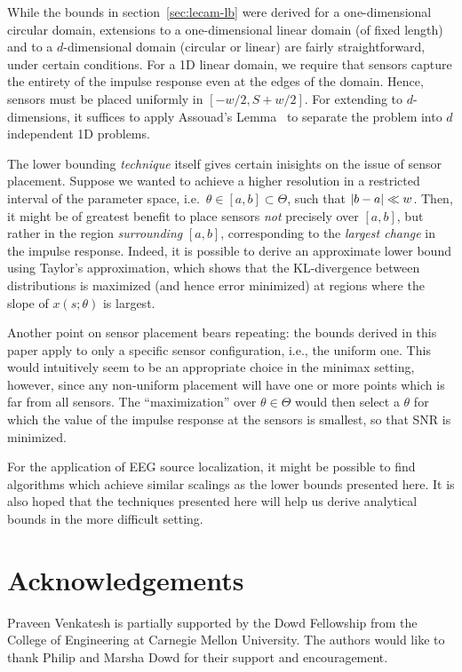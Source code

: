\documentclass[conference]{IEEEtran}
\DeclarePairedDelimiter\abs{\lvert}{\rvert}
\begin{document}
While the bounds in section~\ref{sec:lecam-lb} were derived for a
one-dimensional circular domain, extensions to a one-dimensional linear domain
(of fixed length) and to a $d$-dimensional domain (circular or linear) are
fairly straightforward, under certain conditions. For a 1D linear domain, we
require that sensors capture the entirety of the impulse response even at the
edges of the domain. Hence, sensors must be placed uniformly in $[-w/2,
S{+}w/2]$. For extending to $d$-dimensions, it suffices to apply Assouad's
Lemma~\cite{Tsybakov2009Introduction} to separate the problem into $d$
independent 1D problems.

The lower bounding \emph{technique} itself gives certain inisights on the issue
of sensor placement. Suppose we wanted to achieve a higher resolution in a
restricted interval of the parameter space, i.e.\ $\theta \in [a, b] \subset
\Theta$, such that $\abs{b - a} \ll w$. Then, it might be of greatest benefit
to place sensors \emph{not} precisely over $[a, b]$, but rather in the region
\emph{surrounding} $[a, b]$, corresponding to the \emph{largest change} in the
impulse response. Indeed, it is possible to derive an approximate lower bound
using Taylor's approximation, which shows that the KL-divergence between
distributions is maximized (and hence error minimized) at regions where the
slope of $x(s;\theta)$ is largest.

Another point on sensor placement bears repeating: the bounds derived in this
paper apply to only a specific sensor configuration, i.e., the uniform one.
This would intuitively seem to be an appropriate choice in the minimax setting,
however, since any non-uniform placement will have one or more points which is
far from all sensors. The ``maximization'' over $\theta \in \Theta$ would then
select a $\theta$ for which the value of the impulse response at the sensors is
smallest, so that SNR is minimized.

For the application of EEG source localization, it might be possible to find
algorithms which achieve similar scalings as the lower bounds presented here.
It is also hoped that the techniques presented here will help us derive
analytical bounds in the more difficult setting.

\section*{Acknowledgements}

Praveen Venkatesh is partially supported by the Dowd Fellowship from the
College of Engineering at Carnegie Mellon University. The authors would like to
thank Philip and Marsha Dowd for their support and encouragement.




\end{document}

